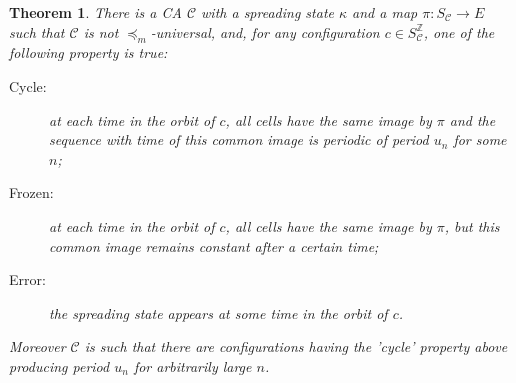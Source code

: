 \documentclass[a4paper]{elsarticle}
\newcommand{\ZZ}{\mathbb{Z}}
\newcommand{\ACC}{\mathcal{C}}
\newcommand\alphabe[1]{S_{#1}}
\newcommand{\alphC}{\alphabe{\ACC}}
\newcommand{\simu}{\preccurlyeq}
\newcommand{\facsacsimu}{\simu_m}
\newcommand\flagseq[1]{u_{#1}}
\newtheorem{thm}{Theorem}[section]
\begin{document}
\begin{thm}
  \label{thm:metronome}
  There is a CA $\ACC$ with a spreading state $\kappa$ and a map ${\pi
    : \alphC\rightarrow E}$ such that $\ACC$ is not
  $\facsacsimu$-universal, and, for any configuration
  $c\in\alphC^\ZZ$, one of the following property is true:
  \begin{description}
  \item[Cycle:] at each time in the orbit of $c$, all cells have the
    same image by $\pi$ and the sequence with time of this common
    image is periodic of period $\flagseq{n}$ for some $n$;
  \item[Frozen:] at each time in the orbit of $c$, all cells have the
    same image by $\pi$, but this common image remains constant after
    a certain time;
  \item[Error:] the spreading state appears at some time in the orbit
    of $c$.
  \end{description}
  Moreover $\ACC$ is such that there are configurations having the
  'cycle' property above producing period $\flagseq{n}$ for
  arbitrarily large $n$.
\end{thm}
\end{document}
